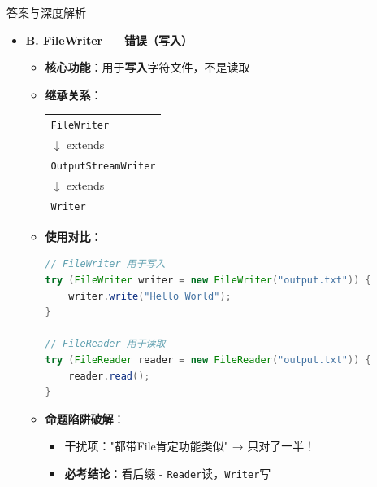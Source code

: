 \documentclass[12pt, a4paper]{ctexart}
\begin{document}
\begin{bluebox}{答案与深度解析}
\begin{itemize}[label={}, nosep]
\begin{itemize}[label={}, leftmargin=*, nosep]
			\item \textbf{命题陷阱破解}：
			      \begin{itemize}[label={}, nosep]
				      \item 干扰项："\texttt{FileWriter} 也可以读" → 方向错误！
				      \item \textbf{必考结论}：\texttt{Reader} 系列用于读，\texttt{Writer} 系列用于写
			      \end{itemize}
		\end{itemize}

		\item \textbf{B. FileWriter — 错误（写入）}
		\begin{itemize}[label={}, leftmargin=*, nosep]
			\item \textbf{核心功能}：用于\textbf{写入}字符文件，不是读取

			\item \textbf{继承关系}：
			      \begin{center}
				      \begin{tabular}{l}
					      \texttt{FileWriter}         \\
					      $\downarrow$ extends        \\
					      \texttt{OutputStreamWriter} \\
					      $\downarrow$ extends        \\
					      \texttt{Writer}             \\
				      \end{tabular}
			      \end{center}

			\item \textbf{使用对比}：
			      \begin{lstlisting}[language=Java]
// FileWriter 用于写入
try (FileWriter writer = new FileWriter("output.txt")) {
    writer.write("Hello World");
}

// FileReader 用于读取
try (FileReader reader = new FileReader("output.txt")) {
    reader.read();
}
      \end{lstlisting}

			\item \textbf{命题陷阱破解}：
			      \begin{itemize}[label={}, nosep]
				      \item 干扰项："都带File肯定功能类似" → 只对了一半！
				      \item \textbf{必考结论}：看后缀 - \texttt{Reader}读，\texttt{Writer}写
			      \end{itemize}
		\end{itemize}


\end{itemize}
\end{bluebox}
\end{document}
